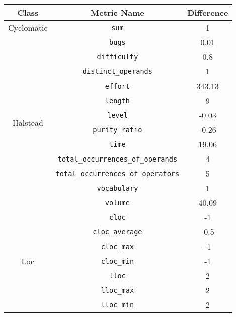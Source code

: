 \begin{center}
  \begin{tabular}{ |c|c|c| }
    \hline

    Class & Metric Name                           & Difference \\

    \hline

    \multirow{ 1 }{6em}{ Cyclomatic }
          & \verb|sum|                            & 1          \\
    \hline
    \multirow{ 12 }{6em}{ Halstead }
          & \verb|bugs|                           & 0.01       \\
          & \verb|difficulty|                     & 0.8        \\
          & \verb|distinct_operands|              & 1          \\
          & \verb|effort|                         & 343.13     \\
          & \verb|length|                         & 9          \\
          & \verb|level|                          & -0.03      \\
          & \verb|purity_ratio|                   & -0.26      \\
          & \verb|time|                           & 19.06      \\
          & \verb|total_occurrences_of_operands|  & 4          \\
          & \verb|total_occurrences_of_operators| & 5          \\
          & \verb|vocabulary|                     & 1          \\
          & \verb|volume|                         & 40.09      \\
    \hline
    \multirow{ 14 }{6em}{ Loc }
          & \verb|cloc|                           & -1         \\
          & \verb|cloc_average|                   & -0.5       \\
          & \verb|cloc_max|                       & -1         \\
          & \verb|cloc_min|                       & -1         \\
          & \verb|lloc|                           & 2          \\
          & \verb|lloc_max|                       & 2          \\
          & \verb|lloc_min|                       & 2          \\

\end{tabular}
\end{center}
